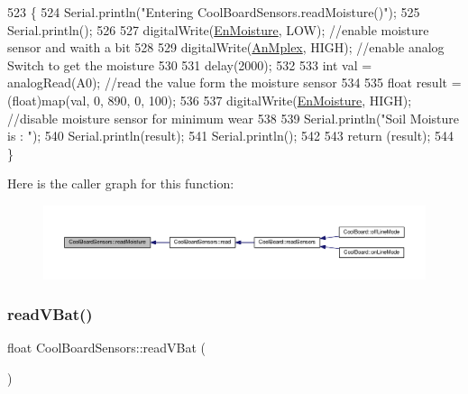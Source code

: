 \begin{DoxyCode}
523 \{
524     Serial.println(\textcolor{stringliteral}{"Entering CoolBoardSensors.readMoisture()"});
525     Serial.println();
526 
527     digitalWrite(\hyperlink{classCoolBoardSensors_a6177d02e14a057a2f171a2e930b5038d}{EnMoisture}, LOW);                 \textcolor{comment}{//enable moisture sensor and waith a bit}
528 
529     digitalWrite(\hyperlink{classCoolBoardSensors_a12ef28b1046219e0aee10bf64e28c4a5}{AnMplex}, HIGH);         \textcolor{comment}{//enable analog Switch to get the moisture}
530 
531     delay(2000);
532 
533     \textcolor{keywordtype}{int} val = analogRead(A0);                       \textcolor{comment}{//read the value form the moisture sensor}
534 
535     \textcolor{keywordtype}{float} result = (float)map(val, 0, 890, 0, 100); 
536 
537     digitalWrite(\hyperlink{classCoolBoardSensors_a6177d02e14a057a2f171a2e930b5038d}{EnMoisture}, HIGH);                  \textcolor{comment}{//disable moisture sensor for minimum wear}
538     
539     Serial.println(\textcolor{stringliteral}{"Soil Moisture is : "});
540     Serial.println(result);
541     Serial.println();
542 
543     \textcolor{keywordflow}{return} (result);
544 \}
\end{DoxyCode}
Here is the caller graph for this function\+:\nopagebreak
\begin{figure}[H]
\begin{center}
\leavevmode
\includegraphics[width=350pt]{classCoolBoardSensors_a8761bff50373c485f4465c8db47d0633_icgraph}
\end{center}
\end{figure}
\mbox{\label{classCoolBoardSensors_a6944b6ea7bce8e2fce1b434acfd9d5f3}} 
\subsubsection{\texorpdfstring{read\+V\+Bat()}{readVBat()}}
{\footnotesize\ttfamily float Cool\+Board\+Sensors\+::read\+V\+Bat (\begin{DoxyParamCaption}{ }\end{DoxyParamCaption})}

